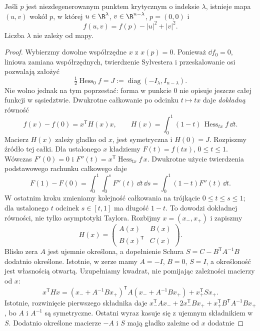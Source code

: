 \begin{twierdzenie}
\label{thm:lemat-morsea-17}
Jeśli $p$ jest niezdegenerowanym punktem
krytycznym o indeksie $\lambda$, istnieje
mapa $(u,v)$ wokół $p$, w której
$u\in\R^\lambda$, $v\in\R^{n-\lambda}$,
$p=(0,0)$ i
\begin{equation}\label{eq:postac-morsea-17}
 f(u,v)=f(p)-|u|^2+|v|^2.
\end{equation}
Liczba $\lambda$ nie zależy od mapy.
\end{twierdzenie}
\begin{proof}
Wybierzmy dowolne współrzędne $x$ z $x(p)=0$.
Ponieważ $\dd f_0=0$, liniowa zamiana
współrzędnych, twierdzenie Sylvestera
i przeskalowanie osi pozwalają założyć
\[
 \tfrac12\operatorname{Hess}_0f
  =J:=\operatorname{diag}(-I_\lambda,I_{n-\lambda}).
\]
Nie wolno jednak na tym poprzestać:
forma w punkcie $0$ nie opisuje jeszcze
całej funkcji w sąsiedztwie.
Dwukrotne całkowanie po odcinku
$t\mapsto tx$ daje \emph{dokładną} równość
\[
 f(x)-f(0)
  =x^{\mathsf T}H(x)x,\qquad
 H(x)=\int_0^1(1-t)\,
                    \operatorname{Hess}_{tx}f\,\dd t.
\]
Macierz $H(x)$ zależy gładko od $x$,
jest symetryczna i $H(0)=J$.
Rozpiszmy źródło tej całki. Dla ustalonego $x$ kładziemy
$F(t)=f(tx)$, $0\leq t\leq1$. Wówczas $F'(0)=0$ i
$F''(t)=x^{\mathsf T}\operatorname{Hess}_{tx}f\,x$.
Dwukrotne użycie twierdzenia podstawowego rachunku całkowego daje
\[
 F(1)-F(0)
 =\int_0^1\int_0^s F''(t)\,\dd t\,\dd s
 =\int_0^1(1-t)F''(t)\,\dd t.
\]
W ostatnim kroku zmieniamy kolejność całkowania
na trójkącie $0\leq t\leq s\leq1$; dla ustalonego $t$
odcinek $s\in[t,1]$ ma długość $1-t$.
To dowodzi dokładnej równości, nie tylko asymptotyki Taylora.
Rozbijmy $x=(x_-,x_+)$ i zapiszmy
\[
 H(x)=
 \begin{pmatrix} A(x)&B(x)\\
                 B(x)^{\mathsf T}&C(x)\end{pmatrix}.
\]
Blisko zera $A$ jest ujemnie określona,
a dopełnienie Schura
$S=C-B^{\mathsf T}A^{-1}B$ dodatnio
określone. Istotnie, w zerze mamy
$A=-I$, $B=0$, $S=I$, a określoność
jest własnością otwartą.
Uzupełniamy kwadrat, nie pomijając
zależności macierzy od $x$:
\[
 x^{\mathsf T}Hx
 =(x_-+A^{-1}Bx_+)^{\mathsf T}
       A(x_-+A^{-1}Bx_+)
   +x_+^{\mathsf T}Sx_+.
\]
Istotnie, rozwinięcie pierwszego składnika daje
$x_-^{\mathsf T}Ax_-+2x_-^{\mathsf T}Bx_+
+x_+^{\mathsf T}B^{\mathsf T}A^{-1}Bx_+$,
bo $A$ i $A^{-1}$ są symetryczne.
Ostatni wyraz kasuje się z ujemnym składnikiem w $S$.
Dodatnio określone macierze $-A$ i $S$
mają gładko zależne od $x$ dodatnie

\end{proof}
